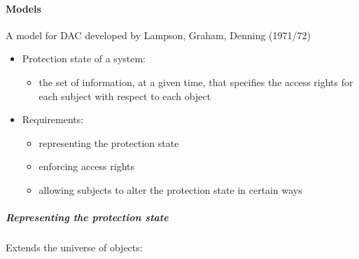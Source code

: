 \documentclass{article}
\begin{document}
                    \paragraph{Models} 
                            A model for DAC developed by Lampson,
                            Graham, Denning (1971/72)
                            \begin{itemize}
                                \item Protection state of a system:
                                \begin{itemize}
                                    \item the set of information, at a given time, that specifies the access rights for each subject with respect to each object
                                \end{itemize}
                                \item Requirements:
                                \begin{itemize}
                                    \item representing the protection state
                                    \item enforcing access rights
                                    \item allowing subjects to alter the protection state in certain ways
                                \end{itemize}
                            \end{itemize}

                            \subparagraph{Representing the
                            protection state}Extends the universe of objects:
\end{document}
